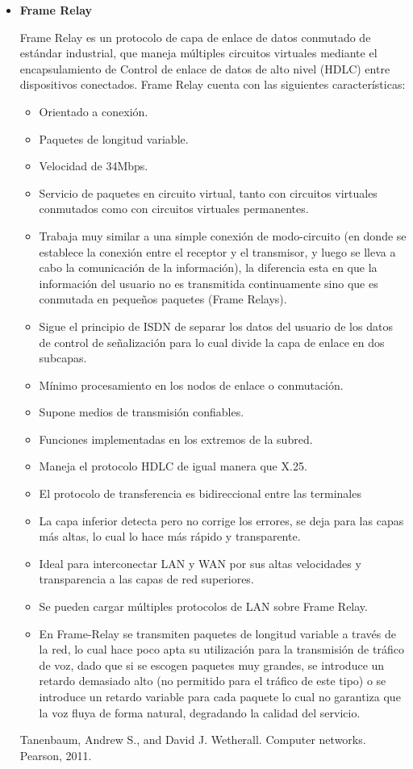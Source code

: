 \documentclass[a4paper,12pt]{article}
\begin{document}
\begin{itemize}
 \item \textbf{Frame Relay}
 
 Frame Relay es un protocolo de capa de enlace de datos conmutado de estándar industrial, que maneja múltiples circuitos virtuales mediante el encapsulamiento de
 Control de enlace de datos de alto nivel (HDLC) entre dispositivos conectados. 
 Frame Relay cuenta con las siguientes características:
 \begin{itemize}
  \item Orientado a conexión.
  \item Paquetes de longitud variable.
  \item Velocidad de 34Mbps.
  \item Servicio de paquetes en circuito virtual, tanto con circuitos virtuales conmutados como con circuitos virtuales permanentes.
  \item Trabaja muy similar a una simple conexión de modo-circuito (en donde se establece la conexión entre el receptor y el transmisor, y luego se lleva a cabo la comunicación de la información), la diferencia esta en que la información del usuario no es transmitida continuamente sino que es conmutada en pequeños paquetes (Frame Relays).
  \item Sigue el principio de ISDN de separar los datos del usuario de los datos de control de señalización para lo cual divide la capa de enlace en dos subcapas.
  \item Mínimo procesamiento en los nodos de enlace o conmutación.
  \item Supone medios de transmisión confiables.
  \item Funciones implementadas en los extremos de la subred.
  \item Maneja el protocolo HDLC de igual manera que X.25.
  \item El protocolo de transferencia es bidireccional entre las terminales
  \item La capa inferior detecta pero no corrige los errores, se deja para las capas más altas, lo cual lo hace más rápido y transparente.
  \item Ideal para interconectar LAN y WAN por sus altas velocidades y transparencia a las capas de red superiores.
  \item Se pueden cargar múltiples protocolos de LAN sobre Frame Relay.
  \item En Frame-Relay se transmiten paquetes de longitud variable a través de la red, lo cual hace poco apta su utilización para la transmisión de tráfico de voz, dado que si se escogen paquetes muy grandes, se introduce un retardo demasiado alto (no permitido para el tráfico de este tipo) o se introduce un retardo variable para cada paquete lo cual no garantiza que la voz fluya de forma natural, degradando la calidad del servicio.
 \end{itemize}

 
\begin{thebibliography}{1}
  Tanenbaum, Andrew S., and David J. Wetherall. Computer networks. Pearson, 2011.

 
 
\end{thebibliography}

 
 
 

 
\end{itemize}
\end{document}
